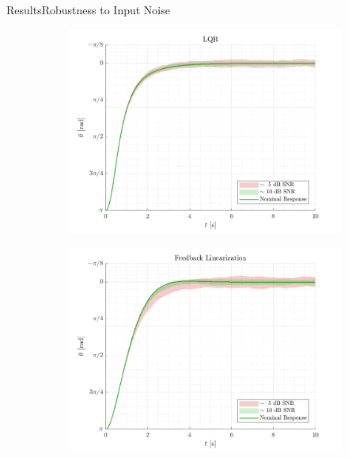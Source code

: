 
\begin{frame}{Results}{Robustness to Input Noise}
\begin{figure}[H]
  \begin{minipage}{0.45\linewidth}
    \begin{figure}[H]
      \centering
      \includegraphics[width=\linewidth]{figures/LQRinputNoise}
    \end{figure}        
  \end{minipage}\hfill      
  \begin{minipage}{0.45\linewidth}
    \begin{figure}[H]
      \centering
      \includegraphics[width=1\linewidth]{figures/feedbackLinearizationInputNoise}
    \end{figure}                
  \end{minipage}\hfill \\
\end{figure}
\end{frame}

